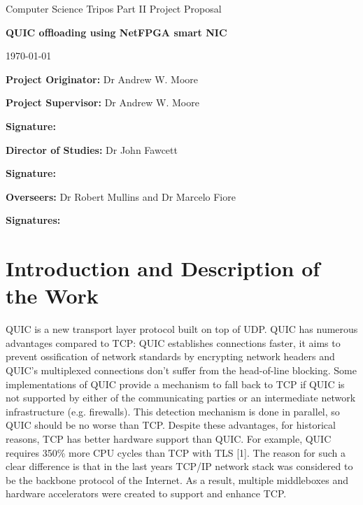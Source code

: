\documentclass[a4paper,12pt]{article}
\begin{document}
\medskip
{}
\medskip
{}

\vfil

\centerline{\large Computer Science Tripos Part II Project Proposal}
\vspace{0.4in}
\centerline{\Large \textbf{QUIC offloading using NetFPGA smart NIC}}
\vspace{0.3in}
\centerline{\large \today}

\vfil

\textbf{Project Originator:} Dr Andrew W. Moore

\vspace{0.5in}

\textbf{Project Supervisor:} Dr Andrew W. Moore

\vspace{0.2in}

{\bf Signature:}

\vspace{0.5in}

{\bf Director of Studies:} Dr John Fawcett 

\vspace{0.2in}

{\bf Signature:}

\vspace{0.5in}

{\bf Overseers:} Dr Robert Mullins and Dr Marcelo Fiore

\vspace{0.2in}

{\bf Signatures:}

\vfil
\eject

\section*{Introduction and Description of the Work}
QUIC is a new transport layer protocol built on top of UDP.
QUIC has numerous advantages compared to TCP: 
QUIC establishes connections faster, 
it aims to prevent ossification of network standards by encrypting network headers 
and	QUIC's multiplexed connections don't suffer from the head-of-line blocking.
Some implementations of QUIC provide a mechanism to fall back to TCP if QUIC is not supported by either of the communicating parties or an intermediate network infrastructure (e.g. firewalls).
This detection mechanism is done in parallel, so QUIC should be no worse than TCP.
Despite these advantages, for historical reasons, TCP has better hardware support than QUIC.
For example, QUIC requires 350\% more CPU cycles than TCP with TLS [1].
The reason for such a clear difference is that in the last years TCP/IP network stack was considered to be the backbone protocol of the Internet.
As a result, multiple middleboxes and hardware accelerators were created to support and enhance TCP.
\end{document}
